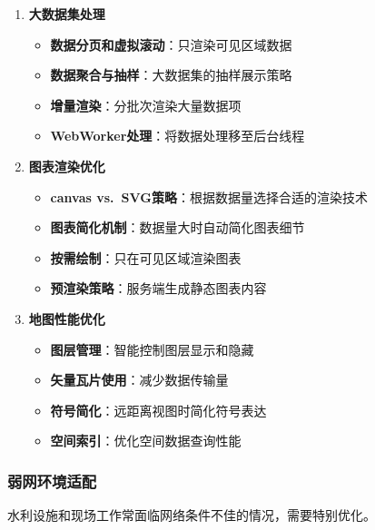 \begin{enumerate}
\def\labelenumi{\arabic{enumi}.}
\tightlist
\item
  \textbf{大数据集处理}

  \begin{itemize}
  \tightlist
  \item
    \textbf{数据分页和虚拟滚动}：只渲染可见区域数据
  \item
    \textbf{数据聚合与抽样}：大数据集的抽样展示策略
  \item
    \textbf{增量渲染}：分批次渲染大量数据项
  \item
    \textbf{WebWorker处理}：将数据处理移至后台线程
  \end{itemize}
\item
  \textbf{图表渲染优化}

  \begin{itemize}
  \tightlist
  \item
    \textbf{canvas vs.~SVG策略}：根据数据量选择合适的渲染技术
  \item
    \textbf{图表简化机制}：数据量大时自动简化图表细节
  \item
    \textbf{按需绘制}：只在可见区域渲染图表
  \item
    \textbf{预渲染策略}：服务端生成静态图表内容
  \end{itemize}
\item
  \textbf{地图性能优化}

  \begin{itemize}
  \tightlist
  \item
    \textbf{图层管理}：智能控制图层显示和隐藏
  \item
    \textbf{矢量瓦片使用}：减少数据传输量
  \item
    \textbf{符号简化}：远距离视图时简化符号表达
  \item
    \textbf{空间索引}：优化空间数据查询性能
  \end{itemize}
\end{enumerate}

\subsubsection{弱网环境适配}\label{ux5f31ux7f51ux73afux5883ux9002ux914d}

水利设施和现场工作常面临网络条件不佳的情况，需要特别优化。


